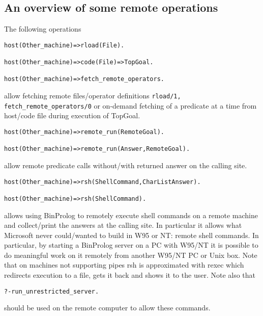 \documentclass{article}
\begin{document}
\subsection{An overview of some remote operations}

The following operations

\begin{verbatim}
host(Other_machine)=>rload(File).

host(Other_machine)=>code(File)=>TopGoal.

host(Other_machine)=>fetch_remote_operators.
\end{verbatim}

allow fetching remote files/operator definitions {\tt rload/1, fetch\_remote\_operators/0} or
on-demand fetching of a predicate at a time from host/code file
during execution of TopGoal.

\begin{verbatim}
host(Other_machine)=>remote_run(RemoteGoal).

host(Other_machine)=>remote_run(Answer,RemoteGoal).
\end{verbatim}

allow remote predicate calls without/with returned answer
on the calling site.

\begin{verbatim}
host(Other_machine)=>rsh(ShellCommand,CharListAnswer).

host(Other_machine)=>rsh(ShellCommand).
\end{verbatim}

allows using BinProlog to remotely execute shell commands
on a remote machine and collect/print the answers at the
calling site. In particular it allows what Microsoft never 
could/wanted to build in W95 or NT: remote shell commands.
In particular, by starting a BinProlog server on a PC with
W95/NT it is possible to do meaningful work on it remotely
from another W95/NT PC or Unix box.
Note that on machines not supporting pipes rsh is approximated
with rexec which redirects execution to a file, gets it
back and shows it to the user. Note also that
\begin{verbatim}
?-run_unrestricted_server.
\end{verbatim}
should be used on the remote computer to allow these commands.
\end{document}
